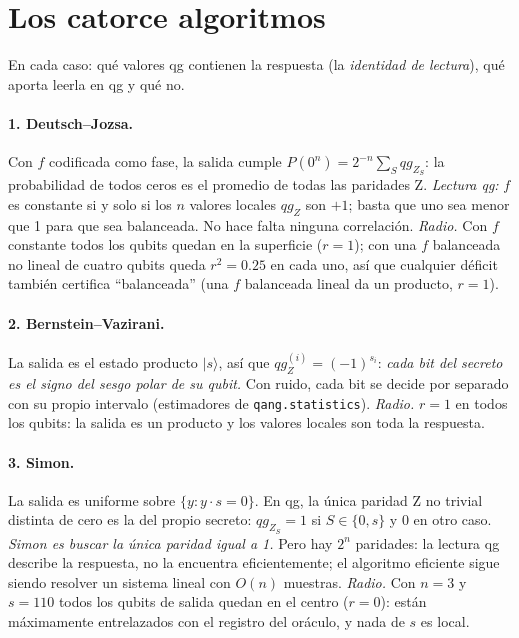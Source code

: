 \documentclass[11pt]{article}
\newcommand{\q}[1]{qg_{#1}}
\newcommand{\qZ}{qg_Z}
\begin{document}
\section{Los catorce algoritmos}

En cada caso: qué valores qg contienen la respuesta (la \emph{identidad de lectura}), qué aporta leerla en
qg y qué no.

\paragraph{1. Deutsch--Jozsa.} Con $f$ codificada como fase, la salida cumple
$P(0^n)=2^{-n}\sum_S\q{Z_S}$: la probabilidad de todos ceros es el promedio de todas las paridades Z.
\emph{Lectura qg:} $f$ es constante si y solo si los $n$ valores locales $\qZ$ son $+1$; basta que uno sea
menor que 1 para que sea balanceada. No hace falta ninguna correlación. \emph{Radio.} Con $f$ constante todos los
qubits quedan en la superficie ($r=1$); con una $f$ balanceada no lineal de cuatro qubits queda $r^2=0.25$ en cada
uno, así que cualquier déficit también certifica ``balanceada'' (una $f$ balanceada lineal da un producto, $r=1$).

\paragraph{2. Bernstein--Vazirani.} La salida es el estado producto $|s\rangle$, así que
$\qZ^{(i)}=(-1)^{s_i}$: \emph{cada bit del secreto es el signo del sesgo polar de su qubit.} Con ruido, cada
bit se decide por separado con su propio intervalo (estimadores de \texttt{qang.statistics}). \emph{Radio.} $r=1$ en
todos los qubits: la salida es un producto y los valores locales son toda la respuesta.

\paragraph{3. Simon.} La salida es uniforme sobre $\{y: y\cdot s=0\}$. En qg, la única paridad Z no trivial
distinta de cero es la del propio secreto: $\q{Z_S}=1$ si $S\in\{0,s\}$ y $0$ en otro caso.
\emph{Simon es buscar la única paridad igual a 1.} Pero hay $2^n$ paridades: la lectura qg describe la
respuesta, no la encuentra eficientemente; el algoritmo eficiente sigue siendo resolver un sistema lineal
con $O(n)$ muestras. \emph{Radio.} Con $n=3$ y $s=110$ todos los qubits de salida quedan en el centro ($r=0$): están
máximamente entrelazados con el registro del oráculo, y nada de $s$ es local.
\end{document}
